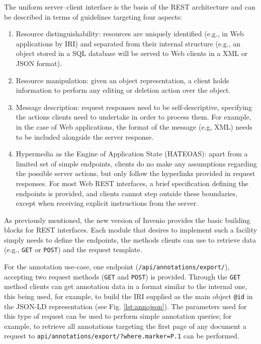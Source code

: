 \FloatBarrier

The uniform server--client interface is the basis of the REST architecture and
can be described in terms of guidelines targeting four aspects:
\begin{enumerate}
  \item Resource distinguishability: resources are uniquely identified (e.g., in
                                     Web applications by IRI) and separated from
                                     their internal structure (e.g., an object
                                     stored in a SQL database will be served to
                                     Web clients in a XML or JSON format).
  \item Resource manipulation: given an object representation, a client holds
                               information to perform any editing or deletion
                               action over the object.
  \item Message description: request responses need to be self-descriptive,
                             specifying the actions clients need to undertake in
                             order to process them. For example, in the case of
                             Web applications, the format of the message (e.g,
                             XML) needs to be included alongside the server
                             response.
  \item Hypermedia as the Engine of Application State (HATEOAS): apart from a
              limited set of simple endpoints, clients do no make any
              assumptions regarding the possible server actions, but only follow
              the hyperlinks provided in request responses. For most Web REST
              interfaces, a brief specification defining the endpoints is
              provided, and clients cannot step outside these boundaries,
              except when receiving explicit instructions from the server.
\end{enumerate}

As previously mentioned, the new version of Invenio provides the basic building
blocks for REST interfaces. Each module that desires to implement such a
facility simply needs to define the endpoints, the methods clients can use to
retrieve data (e.g., \texttt{GET} or \texttt{POST}) and the request template.

For the annotation use-case, one endpoint (\texttt{/api/annotations/export/}),
accepting two request methods (\texttt{GET} and \texttt{POST}) is provided.
Through the \texttt{GET} method clients can get annotation data in a format
similar to the internal one, this being used, for example, to build the IRI
supplied as the main object \texttt{@id} in the JSON-LD representation (see
Fig. \ref{lst:annojson}). The parameters used for this type of request can be
used to perform simple annotation queries; for example, to retrieve all
annotations targeting the first page of any document a request to
\texttt{api/annotations/export/?where.marker=P.1} can be performed.

